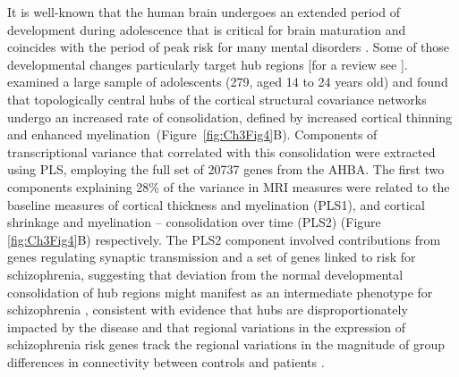 It is well-known that the human brain undergoes an extended period of development during adolescence that is critical for brain maturation and coincides with the period of peak risk for many mental disorders \citep{Paus2008}. Some of those developmental changes particularly target hub regions \citep{Dennis2013,Hwang2013,Baker2015a} [for a review see \citep{Cao2016}].
\citet{Whitaker2016a} examined a large sample of adolescents (279, aged 14 to 24 years old) and found that topologically central hubs of the cortical structural covariance networks undergo an increased rate of consolidation, defined by increased cortical thinning and enhanced \mbox{myelination (Figure \ref{fig:Ch3Fig4}B)}.
Components of transcriptional variance that correlated with this consolidation were extracted using PLS, employing the full set of \num{20737} genes from the AHBA. The first two components explaining 28\% of the variance in MRI measures were related to the baseline measures of cortical thickness and myelination (PLS1), and cortical shrinkage and myelination -- consolidation over time (PLS2) (Figure \ref{fig:Ch3Fig4}B) respectively.
The PLS2 component involved contributions from genes regulating synaptic transmission and a set of genes linked to risk for schizophrenia, suggesting that deviation from the normal developmental consolidation of hub regions might manifest as an intermediate phenotype for schizophrenia \citep{Whitaker2016a}, consistent with evidence that hubs are disproportionately impacted by the disease \citep{VanDenHeuvel2013,Crossley2014,Klauser2016} and that regional variations in the expression of schizophrenia risk genes track the regional variations in the magnitude of group differences in connectivity between controls and patients \citep{Romme2017}.


